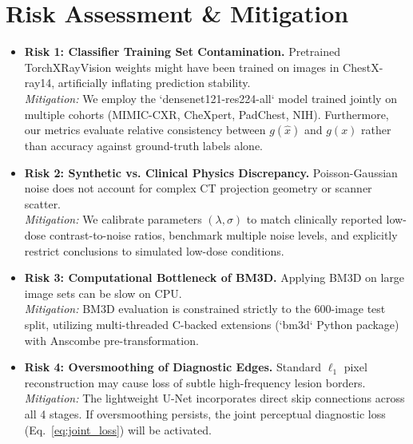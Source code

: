 \documentclass[11pt]{article}
\begin{document}
\section{Risk Assessment \& Mitigation}
\label{sec:risk}
\begin{itemize}[leftmargin=*]
  \item \textbf{Risk 1: Classifier Training Set Contamination.} Pretrained TorchXRayVision weights might have been trained on images in ChestX-ray14, artificially inflating prediction stability. \\
  \emph{Mitigation:} We employ the `densenet121-res224-all` model trained jointly on multiple cohorts (MIMIC-CXR, CheXpert, PadChest, NIH). Furthermore, our metrics evaluate relative consistency between $g(\hat{x})$ and $g(x)$ rather than accuracy against ground-truth labels alone.
  \item \textbf{Risk 2: Synthetic vs. Clinical Physics Discrepancy.} Poisson-Gaussian noise does not account for complex CT projection geometry or scanner scatter. \\
  \emph{Mitigation:} We calibrate parameters $(\lambda, \sigma)$ to match clinically reported low-dose contrast-to-noise ratios, benchmark multiple noise levels, and explicitly restrict conclusions to simulated low-dose conditions.
  \item \textbf{Risk 3: Computational Bottleneck of BM3D.} Applying BM3D on large image sets can be slow on CPU. \\
  \emph{Mitigation:} BM3D evaluation is constrained strictly to the 600-image test split, utilizing multi-threaded C-backed extensions (`bm3d` Python package) with Anscombe pre-transformation.
  \item \textbf{Risk 4: Oversmoothing of Diagnostic Edges.} Standard $\ell_1$ pixel reconstruction may cause loss of subtle high-frequency lesion borders. \\
  \emph{Mitigation:} The lightweight U-Net incorporates direct skip connections across all 4 stages. If oversmoothing persists, the joint perceptual diagnostic loss (Eq.~\ref{eq:joint_loss}) will be activated.
\end{itemize}
\end{document}
